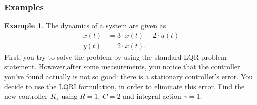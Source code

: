 \documentclass[a4paper,12 pt]{article}
\numberwithin{equation}{section}
\theoremstyle{definition}
\newtheorem{bsp}{Example}
\theoremstyle{remark}
\theoremstyle{definition}
\theoremstyle{definition}
\theoremstyle{definition}
\theoremstyle{remark}
\begin{document}
\subsubsection*{Examples}
\begin{bsp}
The dynamics of a system are given as
\begin{equation*}
\begin{split}
\dot{x}(t)&=3\cdot x(t)+2\cdot u(t)\\
y(t)&=2\cdot x(t).
\end{split}
\end{equation*}
First, you try to solve the problem by using the standard LQR problem statement. However,after some measurements, you notice that the controller you've found actually is not so good: there is a stationary controller's error. You decide to use the LQRI formulation, in order to eliminate this error. Find the new controller $K_e$ using $R=1$, $\bar{C}=2$ and integral action $\gamma=1$.
\newpage


\end{bsp}
\end{document}
